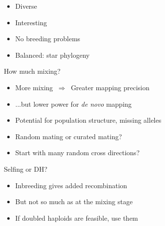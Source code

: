 \documentclass[12pt]{article}
\newcommand{\headsize}{\fontsize{35}{35} \selectfont}
\newcommand{\smallsize}{\fontsize{25}{30} \selectfont}
\begin{document}
\vspace{35mm}

\color{mywhite}
\smallsize

\hfill \begin{minipage}{9.5in}
\begin{itemize}
\itemsep24pt
\item Diverse
\item Interesting
\item No breeding problems
\item Balanced: star phylogeny
\end{itemize}
\end{minipage}


\newpage


\headsize \color{myyellow}
\hfill \begin{minipage}{5.75in}
\centering
How much mixing?
\end{minipage}

\vspace{25mm}

\color{mywhite}
\smallsize

\hfill \begin{minipage}{10in}
\begin{itemize}
\itemsep24pt
\item More mixing $ \ \Rightarrow \ $ Greater mapping precision
\item ...but lower power for \emph{de novo\/} mapping
\item Potential for population structure, missing alleles
\color{myblue}
\item Random mating or curated mating?
\item Start with many random cross directions?
\end{itemize}
\end{minipage}


\newpage


\headsize \color{myyellow}
\hfill \begin{minipage}{5.75in}
\centering
Selfing or DH?
\end{minipage}

\vspace{25mm}

\color{mywhite}
\smallsize

\hfill \begin{minipage}{10in}
\begin{itemize}
\itemsep24pt
\item Inbreeding gives added recombination
\item But not so much as at the mixing stage
\color{myblue}
\item If doubled haploids are feasible, use them
\end{itemize}
\end{minipage}
\end{document}
